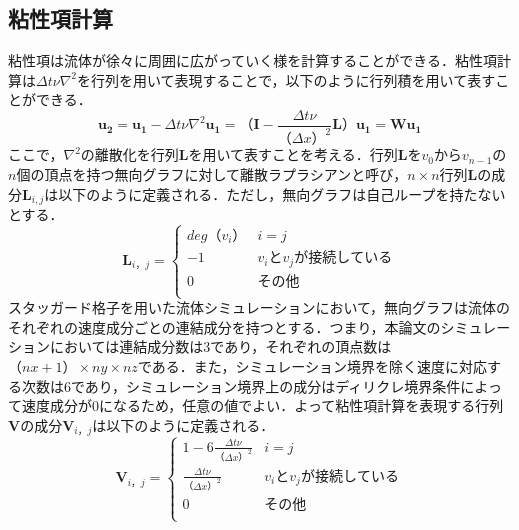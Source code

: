 \documentclass[a4j,12pt]{jreport}
\begin{document}
\subsection{粘性項計算}
粘性項は流体が徐々に周囲に広がっていく様を計算することができる．粘性項計算は$\varDelta t \nu\nabla^2$を行列を用いて表現することで，以下のように行列積を用いて表すことができる．
\begin{equation}\label{eq:discrete Laplacian}
	\bm{u_2}   =  \bm{u_1} - \varDelta t \nu\nabla^2\bm{u_1} = （\mathbf{I} -  \frac{\varDelta t \nu}{（\varDelta x）^2}\mathbf{L}）\bm{u_1} = \mathbf{W}\bm{u_1}
\end{equation}
ここで，$\nabla^2$の離散化を行列$\mathbf{L}$を用いて表すことを考える．行列$\mathbf{L}$を$v_0$から$v_{n-1}$の$n$個の頂点を持つ無向グラフに対して離散ラプラシアンと呼び，$n \times n$行列$\mathbf{L}$の成分$\mathbf{L}_{i,j}$は以下のように定義される．ただし，無向グラフは自己ループを持たないとする．
\begin{equation}
	\mathbf{L}_{i，j} = \begin{cases}
 	deg（v_i） 	& i = j\\
 	-1  		& v_iとv_jが接続している\\
 	0  		& その他\\
 \end{cases}
\end{equation}
スタッガード格子を用いた流体シミュレーションにおいて，無向グラフは流体のそれぞれの速度成分ごとの連結成分を持つとする．つまり，本論文のシミュレーションにおいては連結成分数は3であり，それぞれの頂点数は$（nx+1） \times ny \times nz$である．また，シミュレーション境界を除く速度に対応する次数は$6$であり，シミュレーション境界上の成分はディリクレ境界条件によって速度成分が$0$になるため，任意の値でよい．よって粘性項計算を表現する行列$\mathbf{V}$の成分$\mathbf{V}_{i，j}$は以下のように定義される．
 \[
 	\mathbf{V}_{i，j}  = \begin{cases}
 	1 - 6 \frac{\varDelta t \nu}{（\varDelta x）^2} 	& i = j\\
 	 \frac{\varDelta t \nu}{（\varDelta x）^2}  	& v_iとv_jが接続している\\
 	0  				& その他\\
	 \end{cases}
\]
\end{document}
